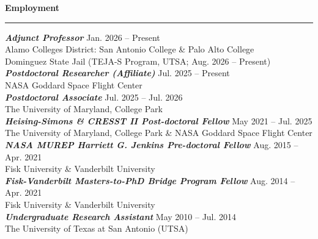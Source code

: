 \documentclass[12pt]{article}
\begin{document}
\noindent
{\bf Employment} \\
\vspace{-10mm}
\begin{center}
\rule{\textwidth}{0.2mm}
\end{center}
\vspace{-3mm}
\textbf{\textit{Adjunct Professor}} \hfill Jan. 2026 -- Present \\
\hspace*{1cm}Alamo Colleges District: San Antonio College \& Palo Alto College \\
\hspace*{1cm}Dominguez State Jail (TEJA-S Program, UTSA; Aug. 2026 -- Present)\\
\textbf{\textit{Postdoctoral Researcher (Affiliate)}}  \hfill  Jul. 2025 -- Present \\
\hspace*{1cm}NASA Goddard Space Flight Center\\
\textbf{\textit{Postdoctoral Associate}}  \hfill  Jul. 2025 -- Jul. 2026 \\
\hspace*{1cm}The University of Maryland, College Park\\
\textbf{\textit{Heising-Simons \& CRESST II Post-doctoral Fellow}}  \hfill  May 2021 -- Jul. 2025 \\
\hspace*{1cm}The University of Maryland, College Park \& NASA Goddard Space Flight Center\\
\textbf{\textit{NASA MUREP Harriett G. Jenkins Pre-doctoral Fellow}} \hfill  Aug. 2015 -- Apr. 2021\\
\hspace*{1cm}Fisk University \& Vanderbilt University \\
\noindent\textit{\textbf{Fisk-Vanderbilt Masters-to-PhD Bridge Program Fellow}} \hfill  Aug. 2014 -- Apr. 2021 \\
\hspace*{1cm}Fisk University \& Vanderbilt University \\
\textbf{\textit{Undergraduate Research Assistant}} \hfill  May 2010 -- Jul. 2014 \\
\hspace*{1cm}The University of Texas at San Antonio (UTSA) \\
\end{document}
